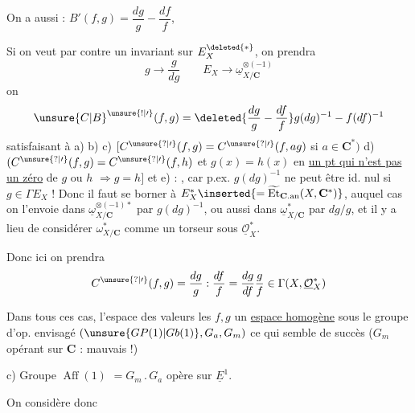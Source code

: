 On a aussi : $B'(f,g)=\dfrac{dg}{g}-\dfrac{df}{f}$, \unsure{\ldots}

Si on veut par contre un invariant sur $E_X^{\deleted{*}}$, on prendra
\[
g\longrightarrow\frac{g}{dg}\qquad
E_X\longrightarrow\underline\omega_{X/\mathbf C}^{\otimes(-1)}
\]
on  
\[
\unsure{C|B}^{\unsure{!|\prime}}(f,g)=
\deleted{\frac{dg}{g}-\frac{df}{f}}
g(dg)^{-1}-f(df)^{-1}
\]
satisfaisant à a) b) c)
$[C^{\unsure{?|\prime}}(f,g)=C^{\unsure{?|\prime}}(f,ag)$
si $a\in\mathbf C^*)$
d) $(C^{\unsure{?|\prime}}(f,g)=C^{\unsure{?|\prime}}(f,h)$ et
$g(x)=h(x)$ en \uline{un pt qui n'est pas un zéro} de $g$ ou $h$
$\Longrightarrow g=h]$ et e) 
 : , car
p.ex. $g(dg)^{-1}$ ne peut être id. nul si $g\in\Gamma E_X$ !
Donc il faut se borner à
$E_X^*\inserted{=\widetilde{\operatorname{Et}}_{\mathbf C.\mathrm{an}}
(X,\mathbf C^*)}$, auquel cas on l'envoie dans
$\underline\omega_{X/\mathbf C}^{\otimes(-1)*}$ par $g(dg)^{-1}$,
ou aussi dans $\underline\omega_{X/\mathbf C}^*$ par $dg/g$,
et il y a lieu de considérer $\omega_{X/\mathbf C}^*$ comme un torseur
sous $\underline{\mathcal O}_X^*$.

Donc ici on prendra
\[
C^{\unsure{?|\prime}}(f,g)=\frac{dg}{g}:\frac{df}{f}
=\frac{dg}{df}\frac{g}{f}\in\Gamma(X,\underline{\mathcal O}_X^*)
\]

Dans tous ces cas, l'espace des valeurs  les $f,g$
 un \uline{espace homogène} sous le groupe d'op.
envisagé $(\unsure{GP(1)|Gb(1)},G_a,G_m)$ ce qui semble
 de succès ($G_m$ opérant sur $\mathbf C$ : mauvais !)

c) Groupe $\operatorname{Aff}(1)$ 
$=G_m\mathbin{.}G_a$ opère sur $\underline E^1$.

On considère donc

